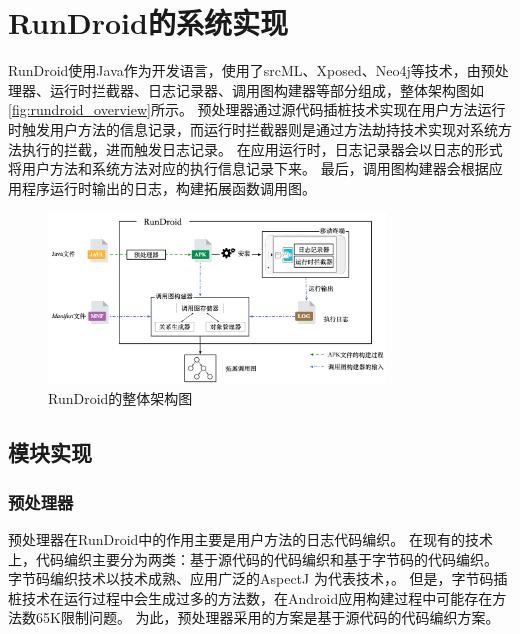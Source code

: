 
\chapter{RunDroid的系统实现 }
\label{chp:implement}

RunDroid使用Java作为开发语言，使用了srcML、Xposed、Neo4j等技术，由预处理器、运行时拦截器、日志记录器、调用图构建器等部分组成，整体架构图如\autoref{fig:rundroid_overview}所示。
预处理器通过源代码插桩技术实现在用户方法运行时触发用户方法的信息记录，而运行时拦截器则是通过方法劫持技术实现对系统方法执行的拦截，进而触发日志记录。
在应用运行时，日志记录器会以日志的形式将用户方法和系统方法对应的执行信息记录下来。
最后，调用图构建器会根据应用程序运行时输出的日志，构建拓展函数调用图。

\begin{figure}[!hb]
	\centering
	\includegraphics[width=0.8\textwidth]{./Figures/overview.png}
	\caption{ RunDroid的整体架构图}
	\label{fig:rundroid_overview}
\end{figure}


\section{模块实现}



\subsection{预处理器}

预处理器在RunDroid中的作用主要是用户方法的日志代码编织。
在现有的技术上，代码编织主要分为两类：基于源代码的代码编织和基于字节码的代码编织。
字节码编织技术以技术成熟、应用广泛的AspectJ\cite{TheAspecJ} 为代表技术，。
但是，字节码插桩技术在运行过程中会生成过多的方法数，在Android应用构建过程中可能存在方法数65K限制问题。
为此，预处理器采用的方案是基于源代码的代码编织方案。

